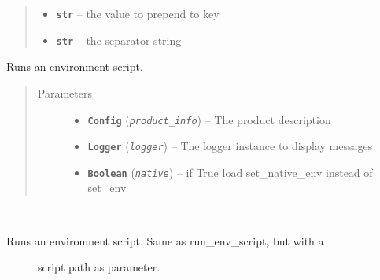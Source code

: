 \documentclass[a4paper,10pt,english]{sphinxmanual}
\begin{document}
\begin{fulllineitems}
\begin{fulllineitems}
\begin{quote}
\begin{description}
\begin{itemize}
\item {} 
\textbf{\texttt{str}} -- the value to prepend to key

\item {} 
\textbf{\texttt{str}} -- the separator string

\end{itemize}

\end{description}\end{quote}

\end{fulllineitems}


\begin{fulllineitems}
\label{commands/apidoc/src:src.environment.SalomeEnviron.run_env_script}
Runs an environment script.
\begin{quote}\begin{description}
\item[{Parameters}] \leavevmode\begin{itemize}
\item {} 
\textbf{\texttt{Config}} (\emph{\texttt{product\_info}}) -- The product description

\item {} 
\textbf{\texttt{Logger}} (\emph{\texttt{logger}}) -- The logger instance to display messages

\item {} 
\textbf{\texttt{Boolean}} (\emph{\texttt{native}}) -- if True load set\_native\_env instead of set\_env

\end{itemize}

\end{description}\end{quote}

\end{fulllineitems}


\begin{fulllineitems}
\label{commands/apidoc/src:src.environment.SalomeEnviron.run_simple_env_script}~\begin{description}
\item[{Runs an environment script. Same as run\_env\_script, but with a }] \leavevmode
script path as parameter.


\end{description}
\end{fulllineitems}
\end{fulllineitems}
\end{document}
